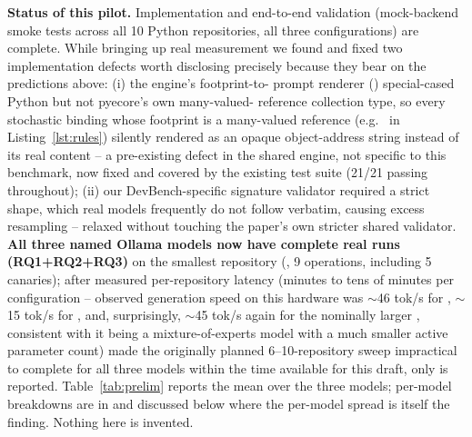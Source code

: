 \textbf{Status of this pilot.} Implementation and end-to-end
validation (mock-backend smoke tests across all 10 Python repositories, all
three configurations) are complete. While bringing up real measurement we
found and fixed two implementation defects worth disclosing precisely
because they bear on the predictions above: (i) the engine's footprint-to-
prompt renderer ()
special-cased Python  but not pyecore's own many-valued-
reference collection type, so every stochastic binding whose footprint is a
many-valued reference (e.g.\  in Listing~\ref{lst:rules})
silently rendered as an opaque object-address string instead of its real
content -- a pre-existing defect in the shared engine, not specific to this
benchmark, now fixed and covered by the existing test suite (21/21 passing
throughout); (ii) our DevBench-specific signature validator required a
strict  shape, which real models frequently do not
follow verbatim, causing excess resampling -- relaxed without touching the
paper's own stricter shared validator. \textbf{All three named Ollama
models now have complete real runs (RQ1+RQ2+RQ3)} on the smallest
repository (, 9 operations, including 5 canaries); after
measured per-repository latency (minutes to tens of minutes per
configuration -- observed generation speed on this hardware was
$\sim$46 tok/s for , $\sim$15 tok/s for
, and, surprisingly, $\sim$45 tok/s again for the
nominally larger , consistent with it being a
mixture-of-experts model with a much smaller active parameter count) made
the originally planned 6--10-repository sweep impractical to complete for
all three models within the time available for this draft, only
 is reported. Table~\ref{tab:prelim} reports the mean over
the three models; per-model breakdowns are in
 and discussed below where the
per-model spread is itself the finding. Nothing here is invented.

